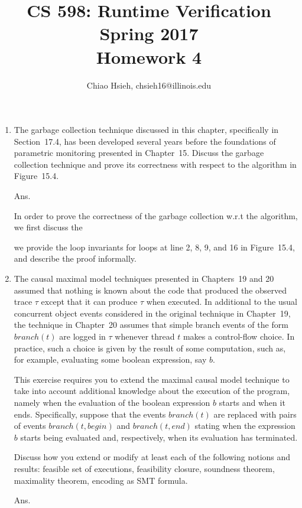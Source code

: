 \documentclass{article}
\title{\Large\bfseries CS 598: Runtime Verification \\
Spring 2017 \\
Homework 4}
\author{Chiao Hsieh, chsieh16@illinois.edu}
\begin{document}
\maketitle

\begin{enumerate}

\item The garbage collection technique discussed in this chapter, specifically in Section~17.4,
has been developed several years before the foundations of parametric monitoring presented in Chapter~15.
Discuss the garbage collection technique and prove its correctness with respect to the algorithm in Figure~15.4.

Ans.

In order to prove the correctness of the garbage collection w.r.t the algorithm,
we first discuss the 

we provide the loop invariants for loops at line 2, 8, 9, and 16 in Figure~15.4,
and describe the proof informally.



\item The causal maximal model techniques presented in Chapters~19 and 20 assumed
that nothing is known about the code that produced the observed trace $\tau$
except that it can produce $\tau$ when executed.
In additional to the usual concurrent object events considered in the original
technique in Chapter~19,
the technique in Chapter~20 assumes that simple branch events of the form 
$branch(t)$ are logged in $\tau$ whenever thread $t$ makes a control-flow choice.
 In practice, such a choice is given by the result of some computation,
such as, for example, evaluating some boolean expression, say $b$.

This exercise requires you to extend the maximal causal model technique to take
into account additional knowledge about the execution of the program,
namely when the evaluation of the boolean expression $b$ starts and when it ends.
Specifically, suppose that the events $branch(t)$ are replaced with pairs of
events $branch(t, begin)$ and $branch(t,end)$ stating when the expression $b$
starts being evaluated and, respectively, when its evaluation has terminated.

Discuss how you extend or modify at least each of the following notions and
results: feasible set of executions, feasibility closure, soundness theorem,
maximality theorem, encoding as SMT formula.

\newcommand{\Rest}{\ensuremath{\upharpoonright}}
\newcommand{\F}{\ensuremath{\mathcal{F}}}
Ans.


\end{enumerate}
\end{document}
